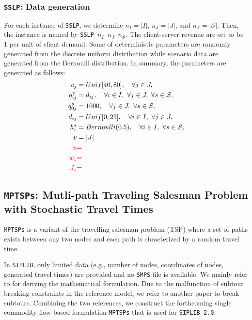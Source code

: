 \subsubsection{\texttt{SSLP}: Data generation}
For each instance of \texttt{SSLP}, we determine $n_I=|I|$, $n_J=|J|$, and $n_\mathcal{S}=|\mathcal{S}|$. Then, the instance is named by \texttt{SSLP\_$n_I$\_$n_J$\_$n_\mathcal{S}$}. The client-server revenue are set to be 1 per unit of client demand. Some of deterministic parameters are randomly generated from the discrete uniform distribution while scenario data are generated from the Bernoulli distribution. In summary, the parameters are generated as follows:
\begin{align*}
c_j	&=Unif[40,80],\quad\forall j\in J,\\
q_{ij}^s	&= d_{ij},\quad\forall i\in I,\ \forall j\in J,\ \forall s\in\mathcal{S},\\
q_{0j}^s	&=	1000,\quad\forall j\in J,\ \forall s\in\mathcal{S},\\
d_{ij}	&= Unif[0,25],\quad\forall i\in I,\ \forall j\in J,\\
h_i^s	&= Bernoulli(0.5),\quad\forall i\in I,\ \forall s\in \mathcal{S},\\
v 		&= |J|	\\
\textcolor{red}{u	}&\textcolor{red}{=		}\\
\textcolor{red}{w_z	}&\textcolor{red}{=		}\\
\textcolor{red}{J_z	}&\textcolor{red}{=	}
\end{align*}

\subsection{\texttt{MPTSPs}: Mutli-path Traveling Salesman Problem with Stochastic Travel Times}
\texttt{MPTSPs} is a variant of the travelling salesman problem (TSP) where a set of paths exists between any two nodes and each path is chracterized by a random travel time. 

In \texttt{SIPLIB}, only limited data (e.g., number of nodes, coordinates of nodes, generated travel times) are provided and no \texttt{SMPS} file is available. We mainly refer to \cite{journal:PGM2017} for deriving the mathematical formulation. Due to the malfunction of subtour breaking constraints in the reference model, we refer to another paper \cite{journal:LSD1990} to break subtours. Combining the two references, we construct the forthcoming single commodity flow-based formulation \texttt{MPTSPs} that is used for \texttt{SIPLIB 2.0}. 

